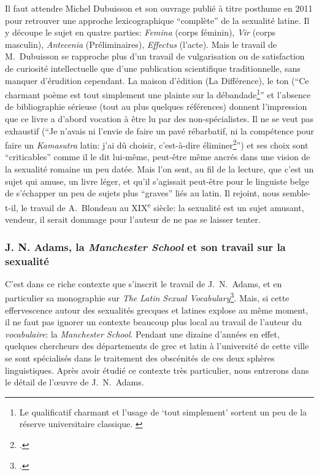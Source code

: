 Il faut attendre Michel Dubuisson et son ouvrage publié à titre posthume en 2011 pour retrouver une approche lexicographique \enquote{complète} de la sexualité latine. Il y découpe le sujet en quatre parties: \textit{Femina} (corps féminin), \textit{Vir} (corps masculin), \textit{Antecenia} (Préliminaires), \textit{Effectus} (l'acte). Mais le travail de M.~Dubuisson se rapproche plus d'un travail de vulgarisation ou de satisfaction de curiosité intellectuelle que d'une publication scientifique traditionnelle, sans manquer d'érudition cependant. La maison d'édition (La Différence), le ton (\enquote{Ce charmant poème est tout simplement une plainte sur la débandade\footnote{Le qualificatif charmant et l'usage de \enquote{tout simplement} sortent un peu de la réserve universitaire classique. \textcite[p.~21]{dubuisson_lasciva_2011}}} et l'absence de bibliographie sérieuse (tout au plus quelques références) donnent l'impression que ce livre a d'abord vocation à être lu par des non-spécialistes. Il ne se veut pas exhaustif (\enquote{Je n'avais ni l'envie de faire un pavé rébarbatif, ni la compétence pour faire un \textit{Kamasutra} latin: j'ai dû choisir, c'est-à-dire éliminer\footcite[p.~13]{dubuisson_lasciva_2011}}) et ses choix sont \enquote{criticables} comme il le dit lui-même, peut-être même ancrés dans une vision de la sexualité romaine un peu datée. Mais l'on sent, au fil de la lecture, que c'est un sujet qui amuse, un livre léger, et qu'il s'agissait peut-être pour le linguiste belge de s'échapper un peu de sujets plus \enquote{graves} liés au latin. Il rejoint, nous semble-t-il, le travail de A.~Blondeau au XIX\textsuperscript{e} siècle: la sexualité est un sujet amusant, vendeur, il serait dommage pour l'auteur de ne pas se laisser tenter.


\subsubsection{J. N. Adams, la \textit{Manchester School} et son travail sur la sexualité}

C'est dans ce riche contexte que s'inscrit le travail de J.~N.~Adams, et en particulier sa monographie sur \textit{The Latin Sexual Vocabulary}\footcite{adams}. Mais, si cette effervescence autour des sexualités grecques et latines explose au même moment, il ne faut pas ignorer un contexte beaucoup plus local au travail de l'auteur du \textit{vocabulaire}: la \textit{Manchester School}. Pendant une dizaine d'années en effet, quelques chercheurs des départements de grec et latin à l'université de cette ville se sont spécialisés dans le traitement des obscénités de ces deux sphères linguistiques. Après avoir étudié ce contexte très particulier, nous entrerons dans le détail de l'œuvre de J.~N.~Adams.

